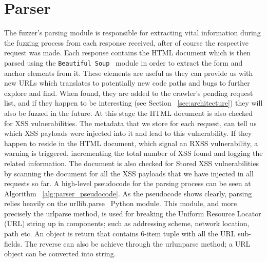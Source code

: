 \section{Parser}
The fuzzer's parsing module is responsible for extracting vital information during the fuzzing process from each response received, after of course the respective request was made. Each response contains the HTML document which is then parsed using the {\tt  Beautiful Soup}~\cite{beautiful_soup} module in order to extract the form and anchor elements from it. These elements are useful as they can provide us with new URLs which translates to potentially new code paths and bugs to further explore and find. When found, they are added to the crawler's pending request list, and if they happen to be interesting (see Section ~\ref{sec:architecture}) they will also be fuzzed in the future. At this stage the HTML document is also checked for XSS vulnerabilities. The metadata that we store for each request, can tell us which XSS payloads were injected into it and lead to this vulnerability. If they happen to reside in the HTML document, which signal an RXSS vulnerability, a warning is triggered, incrementing the total number of XSS found and logging the related information. The document is also checked for Stored XSS vulnerabilities by scanning the document for all the XSS payloads that we have injected in all requests so far. A high-level pseudocode for the parsing process can be seen at Algorithm ~\ref{alg:parser_pseudocode}. As the pseudocode shows clearly, parsing relies heavily on the urllib.parse~\cite{urllib_parse} Python module. This module, and more precisely the urlparse method, is used for breaking the Uniform Resource Locator (URL) string up in components; such as addressing scheme, network location, path etc. An object is return that contains 6-item tuple with all the URL sub-fields. The reverse can also be achieve through the urlunparse method; a URL object can be converted into string.

